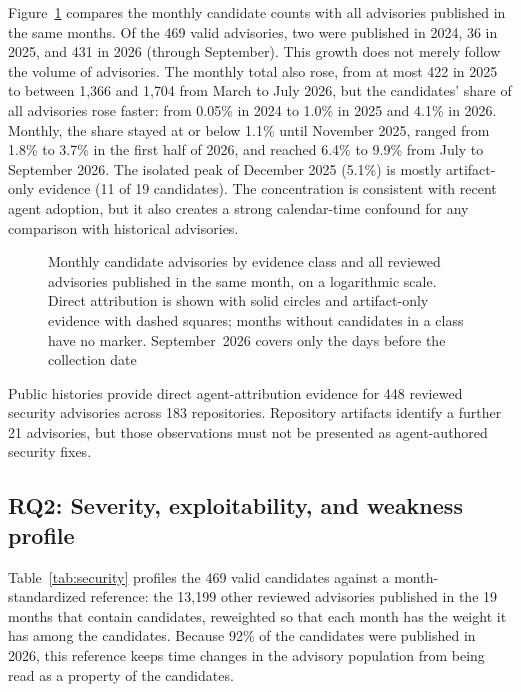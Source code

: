 \documentclass[smallextended,natbib]{svjour3}
\begin{document}
Figure~\ref{fig:monthly} compares the monthly candidate counts with all
advisories published in the same months.  Of the 469 valid advisories, two were
published in 2024, 36 in 2025, and 431 in 2026 (through September).  This growth
does not merely follow the volume of advisories.  The monthly total also rose,
from at most 422 in 2025 to between 1{,}366 and 1{,}704 from March to July
2026, but the candidates' share of all advisories rose faster: from 0.05\% in
2024 to 1.0\% in 2025 and 4.1\% in 2026.  Monthly, the share stayed at or below
1.1\% until November 2025, ranged from 1.8\% to 3.7\% in the first half of
2026, and reached 6.4\% to 9.9\% from July to September 2026.  The isolated
peak of December 2025 (5.1\%) is mostly artifact-only evidence (11 of 19
candidates).  The concentration is consistent with recent agent adoption, but it also
creates a strong calendar-time confound for any comparison with historical
advisories.

\begin{figure}[t]
\centering

\caption{Monthly candidate advisories by evidence class and all reviewed
advisories published in the same month, on a logarithmic scale. Direct
attribution is shown with solid circles and artifact-only evidence with dashed
squares; months without candidates in a class have no marker.
September~2026 covers only the days before the collection date}
\label{fig:monthly}
\end{figure}

\begin{resultbox}
Public histories provide direct agent-attribution evidence for 448 reviewed
security advisories across 183 repositories.  Repository artifacts identify a
further 21 advisories, but those observations must not be presented as
agent-authored security fixes.
\end{resultbox}

\subsection{RQ2: Severity, exploitability, and weakness profile}
\label{sec:rq2}

Table~\ref{tab:security} profiles the 469 valid candidates against a
month-standardized reference: the 13{,}199 other reviewed advisories published
in the 19 months that contain candidates, reweighted so that each month has the
weight it has among the candidates.  Because 92\% of the candidates were
published in 2026, this reference keeps time changes in the advisory
population from being read as a property of the candidates.
\end{document}
